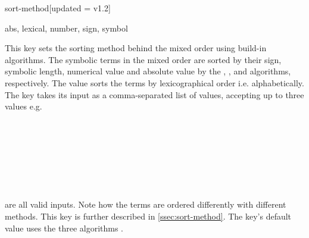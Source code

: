 	\begin{option}{sort-method}[updated = v1.2]
		\begin{values}[default = {sign, symbol, abs}]
			abs, lexical, number, sign, symbol
		\end{values}
		This key sets the sorting method behind the mixed order using build-in algorithms. The symbolic terms in the mixed order are sorted by their sign, symbolic length, numerical value and absolute value by the , ,  and  algorithms, respectively. The value  sorts the terms by lexicographical order i.e. alphabetically. The key takes its input as a comma-separated list of values, accepting up to three values e.g.
		
		\begin{example}
			 \\
			 \\
			 \\
			 \\
			 \\
			 \\
		\end{example}
		
		\noindent are all valid inputs. Note how the terms are ordered differently with different methods. This key is further described in \cref{ssec:sort-method}. The key's default value uses the three algorithms .
	\end{option}
	
